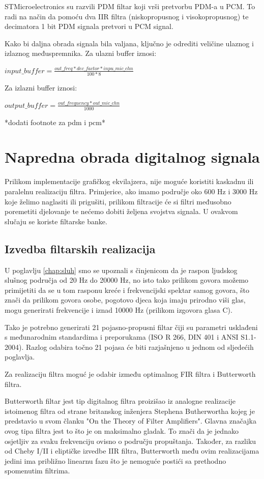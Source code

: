 \documentclass[times, utf8, diplomski]{fer}
\begin{document}
STMicroelectronics su razvili PDM filtar koji vrši pretvorbu PDM-a u PCM. To radi na način da pomoću dva IIR filtra (niskopropusnog i visokopropusnog) te decimatora 1 bit PDM signala pretvori u PCM signal. 

Kako bi daljna obrada signala bila valjana, ključno je odrediti veličine ulaznog i izlaznog međuspremnika. Za ulazni buffer iznosi:

$input\_buffer = \frac{out\_freq* dec\_factor * inpu\_mic\_chn}{100*8}$

Za izlazni buffer iznosi:

$output\_buffer = \frac{out\_frequency* out\_mic\_chn}{1000} $

*dodati footnote za pdm i pcm*

\chapter{Napredna obrada digitalnog signala}
Prilikom implementacije grafičkog ekvilajzera, nije moguće koristiti kaskadnu ili paralelnu realizaciju filtra. Primjerice, ako imamo područje oko 600 Hz i 3000 Hz koje želimo naglasiti ili prigušiti, prilikom filtracije će si filtri međusobno poremetiti djelovanje te nećemo dobiti željena svojstva signala. U ovakvom slučaju se koriste filtarske banke.

\section{Izvedba filtarskih realizacija}\label{filtri}
U poglavlju \ref{chap:sluh} smo se upoznali s činjenicom da je raspon ljudskog slušnog područja od 20 Hz do 20000 Hz, no isto tako prilikom govora možemo primijetiti da se u tom rasponu kreće i frekvencijski spektar samog govora, što znači da prilikom govora osobe, pogotovo djeca koja imaju prirodno viši glas, mogu generirati frekvencije i iznad 10000 Hz (prilikom izgovora glasa C). 

Tako je potrebno generirati 21 pojasno-propusni filtar  čiji su parametri usklađeni s međunarodnim standardima i preporukama (ISO R 266, DIN 401 i ANSI S1.1-2004). Razlog odabira točno 21 pojasa će biti razjašnjeno u jednom od sljedećih poglavlja.
 
Za realizaciju filtra moguć je odabir između optimalnog FIR filtra i Butterworth filtra. 

Butterworth filtar jest tip digitalnog filtra proizišao iz analogne realizacije istoimenog filtra od strane britanskog inženjera Stephena Butherwortha kojeg je predstavio u svom članku "On the Theory of Filter Amplifiers". Glavna značajka ovog tipa filtra jest to što je on maksimalno gladak. To znači da je jednako osjetljiv za svaku frekvenciju ovisno o području propuštanja. Također, za razliku od Cheby I/II i eliptičke izvedbe IIR filtra, Butterworth među ovim realizacijama jedini ima približno linearnu fazu što je nemoguće postići sa prethodno spomenutim filtrima.
\end{document}
